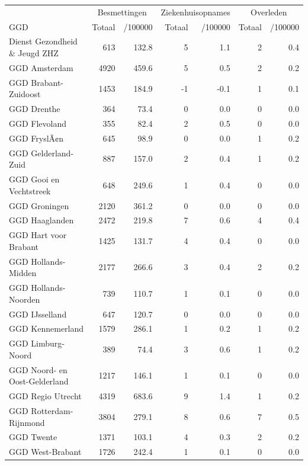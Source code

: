 \documentclass[
  english,
  man,floatsintext]{apa6}
\begin{document}
\begin{table}
\centering\begingroup\fontsize{10}{12}\selectfont

\begin{threeparttable}
\begin{tabular}{lrrrrrr}
\toprule
\multicolumn{1}{c}{ } & \multicolumn{2}{c}{Besmettingen} & \multicolumn{2}{c}{Ziekenhuisopnames} & \multicolumn{2}{c}{Overleden} \\
\cmidrule(l{3pt}r{3pt}){2-3} \cmidrule(l{3pt}r{3pt}){4-5} \cmidrule(l{3pt}r{3pt}){6-7}
GGD & Totaal & /100000 & Totaal & /100000 & Totaal & /100000\\
\midrule
Dienst Gezondheid \& Jeugd ZHZ & 613 & 132.8 & 5 & 1.1 & 2 & 0.4\\
GGD Amsterdam & 4920 & 459.6 & 5 & 0.5 & 2 & 0.2\\
GGD Brabant-Zuidoost & 1453 & 184.9 & -1 & -0.1 & 1 & 0.1\\
GGD Drenthe & 364 & 73.4 & 0 & 0.0 & 0 & 0.0\\
GGD Flevoland & 355 & 82.4 & 2 & 0.5 & 0 & 0.0\\
GGD FryslÃ¢n & 645 & 98.9 & 0 & 0.0 & 1 & 0.2\\
GGD Gelderland-Zuid & 887 & 157.0 & 2 & 0.4 & 1 & 0.2\\
GGD Gooi en Vechtstreek & 648 & 249.6 & 1 & 0.4 & 0 & 0.0\\
GGD Groningen & 2120 & 361.2 & 0 & 0.0 & 0 & 0.0\\
GGD Haaglanden & 2472 & 219.8 & 7 & 0.6 & 4 & 0.4\\
GGD Hart voor Brabant & 1425 & 131.7 & 4 & 0.4 & 0 & 0.0\\
GGD Hollands-Midden & 2177 & 266.6 & 3 & 0.4 & 2 & 0.2\\
GGD Hollands-Noorden & 739 & 110.7 & 1 & 0.1 & 0 & 0.0\\
GGD IJsselland & 647 & 120.7 & 0 & 0.0 & 0 & 0.0\\
GGD Kennemerland & 1579 & 286.1 & 1 & 0.2 & 1 & 0.2\\
GGD Limburg-Noord & 389 & 74.4 & 3 & 0.6 & 1 & 0.2\\
GGD Noord- en Oost-Gelderland & 1217 & 146.1 & 1 & 0.1 & 0 & 0.0\\
GGD Regio Utrecht & 4319 & 683.6 & 9 & 1.4 & 1 & 0.2\\
GGD Rotterdam-Rijnmond & 3804 & 279.1 & 8 & 0.6 & 7 & 0.5\\
GGD Twente & 1371 & 103.1 & 4 & 0.3 & 2 & 0.2\\
GGD West-Brabant & 1726 & 242.4 & 1 & 0.1 & 0 & 0.0\\

\end{tabular}
\end{threeparttable}
\end{table}
\end{document}
